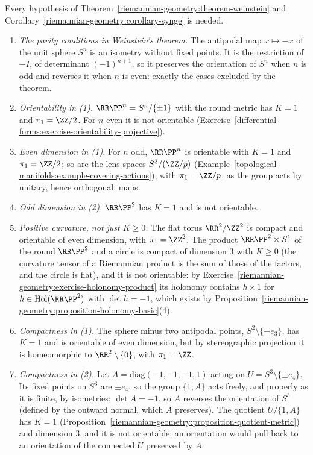 \begin{counterexample}\label{riemannian-geometry:counterexample-synge}
Every hypothesis of Theorem~\ref{riemannian-geometry:theorem-weinstein} and Corollary~\ref{riemannian-geometry:corollary-synge} is needed.
\begin{enumerate}
\item \emph{The parity conditions in Weinstein's theorem.} The antipodal map $x \mapsto -x$ of the unit sphere $S^n$ is an isometry without fixed points. It is the restriction
of $-I$, of determinant $(-1)^{n+1}$, so it preserves the orientation of $S^n$ when $n$ is odd and reverses it when $n$ is even: exactly the cases excluded by the theorem.
\item \emph{Orientability in (1).} $\RR\PP^n = S^n/\{\pm1\}$ with the round metric has $K = 1$ and $\pi_1 = \ZZ/2$. For $n$ even it is not orientable
(Exercise~\ref{differential-forms:exercise-orientability-projective}).
\item \emph{Even dimension in (1).} For $n$ odd, $\RR\PP^n$ is orientable with $K = 1$ and $\pi_1 = \ZZ/2$; so are the lens spaces $S^3/(\ZZ/p)$
(Example~\ref{topological-manifolds:example-covering-actions}), with $\pi_1 = \ZZ/p$, as the group acts by unitary, hence orthogonal, maps.
\item \emph{Odd dimension in (2).} $\RR\PP^2$ has $K = 1$ and is not orientable.
\item \emph{Positive curvature, not just $K \geq 0$.} The flat torus $\RR^2/\ZZ^2$ is compact and orientable of even dimension, with $\pi_1 = \ZZ^2$. The product
$\RR\PP^2 \times S^1$ of the round $\RR\PP^2$ and a circle is compact of dimension $3$ with $K \geq 0$ (the curvature tensor of a Riemannian product is the sum of those of the factors, and the circle is flat), and it is not
orientable: by Exercise~\ref{riemannian-geometry:exercise-holonomy-product} its holonomy contains $h \times 1$ for $h \in \mathrm{Hol}(\RR\PP^2)$ with $\det h = -1$, which
exists by Proposition~\ref{riemannian-geometry:proposition-holonomy-basic}(4).
\item \emph{Compactness in (1).} The sphere minus two antipodal points, $S^2 \setminus \{\pm e_3\}$, has $K = 1$ and is orientable of even dimension, but by stereographic
projection it is homeomorphic to $\RR^2 \setminus \{0\}$, with $\pi_1 = \ZZ$.
\item \emph{Compactness in (2).} Let $A = \mathrm{diag}(-1, -1, -1, 1)$ acting on $U = S^3 \setminus \{\pm e_4\}$. Its fixed points on $S^3$ are $\pm e_4$, so the group
$\{1, A\}$ acts freely, and properly as it is finite, by isometries; $\det A = -1$, so $A$ reverses the orientation of $S^3$ (defined by the outward normal, which $A$
preserves). The quotient $U/\{1, A\}$ has $K = 1$ (Proposition~\ref{riemannian-geometry:proposition-quotient-metric}) and dimension $3$, and it is not orientable: an
orientation would pull back to an orientation of the connected $U$ preserved by $A$.
\end{enumerate}
\end{counterexample}

